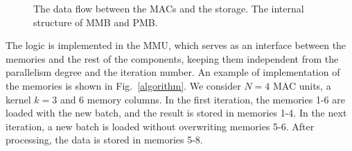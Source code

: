 \documentclass[conference,compsoc]{IEEEtran}
\begin{document}
\begin{figure}[!t]
\centering
{}
\hfil
\centering
{}
\caption{\protect{} The data flow between the MACs and the
  storage. \protect{} The internal structure of MMB and PMB.}
\label{muxes}
\end{figure}

The logic is implemented in the MMU, which serves as an interface between the
memories and the rest of the components, keeping them independent from the
parallelism degree and the iteration number. An example of implementation of the
memories is shown in Fig.~\ref{algorithm}. We consider $N=4$ MAC units, a kernel
$k=3$ and 6 memory columns. In the first iteration, the memories 1-6 are
loaded with the new batch, and the result is stored in memories 1-4. In the next
iteration, a new batch is loaded without overwriting memories 5-6. After
processing, the data is stored in memories 5-8. 
\end{document}
